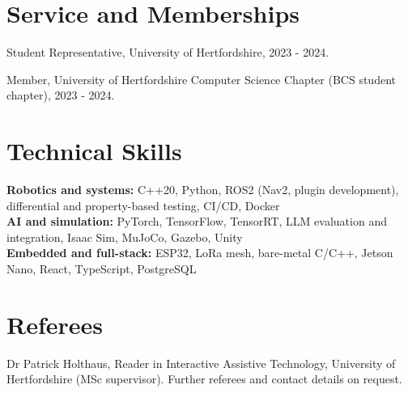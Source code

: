\documentclass[10pt]{article}
\newcommand{\gap}{\vspace{4pt}}
\begin{document}
\section{Service and Memberships}
{\small
Student Representative, University of Hertfordshire, 2023 - 2024.\par\gap
Member, University of Hertfordshire Computer Science Chapter (BCS student chapter), 2023 - 2024.}

\section{Technical Skills}
{\small
\textbf{Robotics and systems:} C++20, Python, ROS2 (Nav2, plugin development), differential and property-based testing, CI/CD, Docker\\
\textbf{AI and simulation:} PyTorch, TensorFlow, TensorRT, LLM evaluation and integration, Isaac Sim, MuJoCo, Gazebo, Unity\\
\textbf{Embedded and full-stack:} ESP32, LoRa mesh, bare-metal C/C++, Jetson Nano, React, TypeScript, PostgreSQL}

\section{Referees}
{\small
Dr Patrick Holthaus, Reader in Interactive Assistive Technology, University of Hertfordshire (MSc supervisor).
Further referees and contact details on request.}
\end{document}
